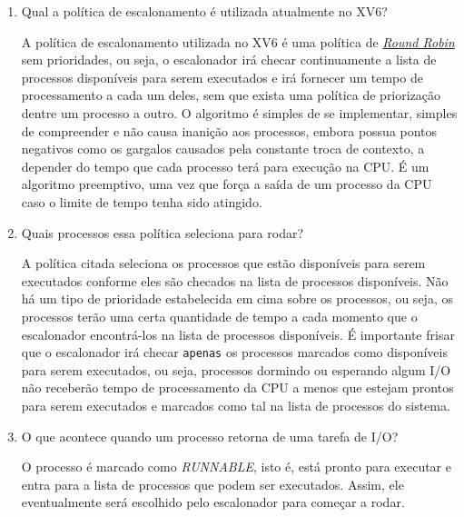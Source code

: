 \documentclass{article}
\begin{document}
\begin{enumerate}
      \item Qual a política de escalonamento é utilizada atualmente no XV6?

            A política de escalonamento utilizada no XV6 é uma política de
            \href{https://en.wikipedia.org/wiki/Round-robin_scheduling}{\textit{Round
                        Robin}} sem prioridades, ou seja, o escalonador irá
            checar
            continuamente a lista de processos disponíveis para serem
            executados e irá
            fornecer um tempo de processamento a cada um deles, sem que exista
            uma política de priorização dentre um processo a outro. O algoritmo
            é
            simples de se implementar, simples de compreender e não causa
            inanição aos
            processos, embora possua pontos negativos como os gargalos causados
            pela
            constante troca de contexto, a depender do tempo que cada processo
            terá para
            execução na CPU. É um algoritmo preemptivo, uma vez que força a
            saída de um processo da CPU caso o limite de tempo tenha sido
            atingido.\@

      \item Quais processos essa política seleciona para rodar?

            A política citada seleciona os processos que estão disponíveis para
            serem executados conforme eles são checados na lista de processos
            disponíveis.
            Não há um tipo de prioridade estabelecida em cima sobre os
            processos, ou seja, os processos terão uma certa quantidade de
            tempo a cada
            momento que o escalonador encontrá-los na lista de processos
            disponíveis. É
            importante frisar que o escalonador irá checar \texttt{apenas} os
            processos marcados como disponíveis para serem executados, ou seja,
            processos dormindo ou esperando algum I/O não receberão tempo de
            processamento
            da CPU a menos que estejam prontos para serem executados e marcados
            como tal na
            lista de processos do sistema.

      \item O que acontece quando um processo retorna de uma tarefa de I/O?

            O processo é marcado como \textit{RUNNABLE}, isto é, está pronto
            para executar e entra para a lista de processos que podem ser
            executados.
            Assim, ele eventualmente será escolhido pelo escalonador para
            começar a rodar.


\end{enumerate}
\end{document}
